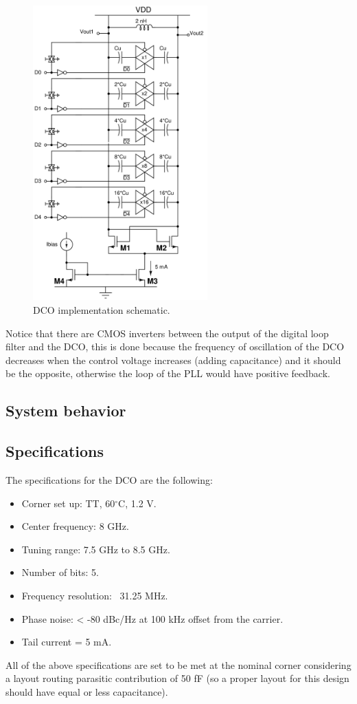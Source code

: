 \begin{figure}[H]
    \centering
    \includegraphics[width=0.6\textwidth]{figures/DCO_implementation.png}
    \caption{DCO implementation schematic.}
    \label{fig:DCO_implementation}
\end{figure}

Notice that there are CMOS inverters between the output of the digital loop filter and the DCO, this is done because the frequency of oscillation of the DCO decreases when the control voltage increases (adding 
capacitance) and it should be the opposite, otherwise the loop of the PLL would have positive feedback.

\subsection{System behavior}


\subsection{Specifications}
The specifications for the DCO are the following:
\begin{itemize}
    \item Corner set up: TT, 60$^{\circ}$C, 1.2 V.
    \item Center frequency: 8 GHz.
    \item Tuning range: 7.5 GHz to 8.5 GHz.
    \item Number of bits: 5.
    \item Frequency resolution: ~31.25 MHz.
    \item Phase noise: < -80 dBc/Hz at 100 kHz offset from the carrier.
    \item Tail current = 5 mA.
\end{itemize}
All of the above specifications are set to be met at the nominal corner considering a layout routing parasitic contribution of 50 fF (so a proper layout for this design should have equal or less capacitance). 



